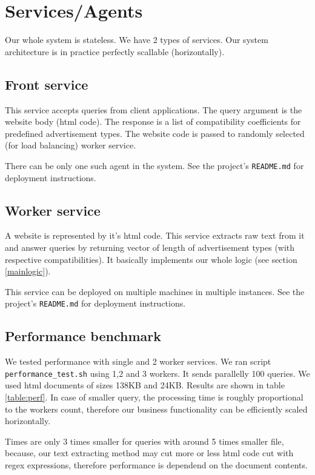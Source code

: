 \documentclass[a4paper]{article}
\begin{document}
\section{Services/Agents}
Our whole system is stateless.
We have 2 types of services.
Our system architecture is in practice perfectly scallable (horizontally).

\subsection{Front service}

This service accepts queries from client applications.
The query argument is the website body (html code).
The response is a list of compatibility coefficients for predefined advertisement types.
The website code is passed to randomly selected (for load balancing) worker service.

There can be only one such agent in the system.
See the project's \texttt{README.md} for deployment instructions.


\subsection{Worker service}
A website is represented by it's html code.
This service extracts raw text from it and answer queries by returning vector of length of advertisement types
(with respective compatibilities).
It basically implements our whole logic (see section \ref{mainlogic}).

This service can be deployed on multiple machines in multiple instances.
See the project's \texttt{README.md} for deployment instructions.

\subsection {Performance benchmark}

We tested performance with single and 2 worker services.
We ran script \texttt{performance\_test.sh} using 1,2 and 3 workers.
It sends parallelly 100 queries.
We used html documents of sizes 138KB and 24KB.
Results are shown in table \ref{table:perf}.
In case of smaller query, the processing time is roughly proportional to the workers count,
therefore our business functionality can be efficiently scaled horizontally.

Times are only 3 times smaller for queries with around 5 times smaller file,
because, our text extracting method may cut
more or less html code cut with regex expressions,
therefore performance is dependend on the document contents.
\end{document}
